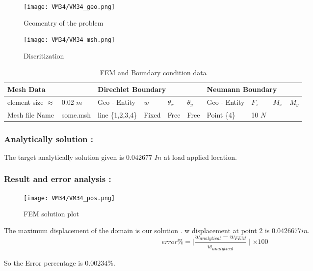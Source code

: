 \documentclass[VM.tex]{subfiles}
\begin{document}
\begin{figure}[h]
\centering
{}
  \texttt{[image: VM34/VM34\_geo.png]}
  \caption{Geomentry of the problem}\label{fig:awesome_image1}
\endminipage\vfill
{}
  \texttt{[image: VM34/VM34\_msh.png]}
  \caption{Discritization}\label{fig:awesome_image2}
\endminipage\vfill
\end{figure}





\begin{table}[h!]
\renewcommand{\arraystretch}{1.5}
\centering
\caption{FEM and Boundary condition data}
\label{my-label}
\begin{tabular}{|p{25mm}l|p{20mm}|lll|p{16mm}|lll|}
\hline
\multicolumn{2}{|l|}{\cellcolor[HTML]{C0C0C0}Mesh Data} & \multicolumn{4}{l|}{\cellcolor[HTML]{C0C0C0}Direchlet Boundary} & \multicolumn{4}{l|}{\cellcolor[HTML]{C0C0C0}Neumann Boundary} \\ \hline \hline
 element size $\approx$      & 0.02 $m$                & Geo - \newline Entity      & $w$          & $\theta _ x$     & $\theta _ y $    & Geo - \newline Entity         & $F_z$        & $M_x$        & $M_y$        \\ \cline {3-10}    
Mesh file Name                   & some.msh        & line \{1,2,3,4\}                   & Fixed      & Free         & Free        & Point \{4\}                    & 10 $N$        &           &           \\ \hline
\end{tabular}
\end{table}
\subsubsection*{Analytically solution : }
The target analytically solution given is 0.042677 $In$ at load applied location. 
\newpage
\subsubsection*{Result and error analysis : }

\begin{figure}[h!]
\centering
{}%
  \texttt{[image: VM34/VM34\_pos.png]}
  \caption{FEM solution plot}\label{fig:awesome_image3}
\endminipage
\end{figure}
The maximum displacement of the domain is our solution . w displacement at point 2 is $ 0.0426677 in $.
\begin{equation}
error \% = \mid \frac{w_{analytical}-w_{FEM}}{w_{analytical}} \mid \times 100
\end{equation}

So the Error percentage is $ 0.00234 \% $. 
\end{document}
